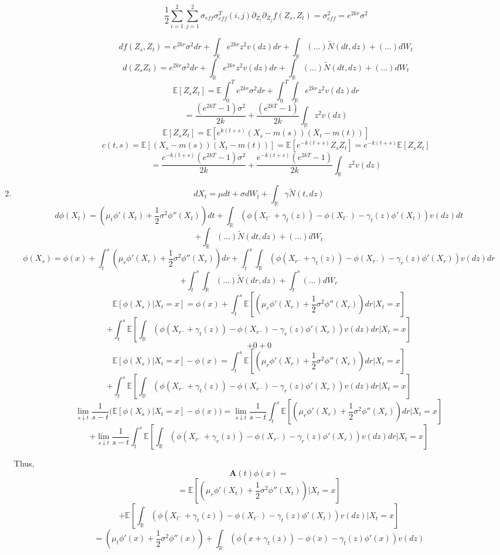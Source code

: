 \documentclass[a4paper,11pt]{article}
\begin{document}
\begin{enumerate}
\begin{enumerate}
 \[\frac{1}{2} \sum_{i=1}^2\sum_{j=1}^2 \sigma_{eff}\sigma_{eff}^T (i,j) \partial_{Z_i} \partial_{Z_j}f(Z_s,Z_t) = \sigma_{eff}^2 = e^{2kr}\sigma^2\]
 
 \[df(Z_s,Z_t)= e^{2kr}\sigma^2 dr + \int_{\mathbb{R}} e^{2kr}z^2v(dz)dr + \int_{\mathbb{R}}(\dots) \widetilde{N}(dt,dz)+(\dots)dW_t \]
  \[d(Z_s Z_t)= e^{2kr}\sigma^2 dr + \int_{\mathbb{R}} e^{2kr}z^2v(dz)dr + \int_{\mathbb{R}}(\dots) \widetilde{N}(dt,dz)+(\dots)dW_t \]
    \[\mathbb{E}[Z_s Z_t]=\mathbb{E} \int_0^T e^{2kr}\sigma^2 dr + \int_0^T  \int_{\mathbb{R}} e^{2kr}z^2v(dz)dr \]
   \[=  \frac{(e^{2kT}-1)\sigma^2}{2k}  + \frac{(e^{2kT}-1)}{2k}  \int_{\mathbb{R}} z^2v(dz) \]
   \[\mathbb{E}[Z_s Z_t]=\mathbb{E}[e^{k(t+s)}(X_s-m(s)) (X_t-m(t))]\]
      \[c(t,s) = \mathbb{E}[(X_s-m(s)) (X_t-m(t))]=\mathbb{E}[e^{-k(t+s)}Z_s Z_t]= e^{-k(t+s)}\mathbb{E}[Z_s Z_t]\]
         \[=  \frac{e^{-k(t+s)}(e^{2kT}-1)\sigma^2}{2k}  + \frac{e^{-k(t+s)}(e^{2kT}-1)}{2k}  \int_{\mathbb{R}} z^2v(dz) \]
\end{enumerate}

\item 
\[dX_t = \mu dt + \sigma dW_t + \int_{\mathbb{R}}\gamma \widetilde{N}(t,dz) \]
\[d\phi(X_t) = (\mu_t \phi'(X_t)+ \frac{1}{2}\sigma^2 \phi''(X_t))dt+ \int_{\mathbb{R}} (\phi(X_{t^-}+\gamma_t(z))-\phi(X_{t^-})-\gamma_t(z)\phi'(X_{t}))v(dz)dt \]
\[+ \int_{\mathbb{R}}(\dots) \widetilde{N}(dt,dz)+(\dots)dW_t \]
\[\phi(X_s) = \phi(x)+\int_t^s (\mu_r \phi'(X_r)+ \frac{1}{2}\sigma^2 \phi''(X_r))dr+ \int_t^s\int_{\mathbb{R}} (\phi(X_{r^-}+\gamma_t(z))-\phi(X_{r^-})-\gamma_r(z)\phi'(X_{r}))v(dz)dr \]
\[+ \int_t^s \int_{\mathbb{R}}(\dots) \widetilde{N}(dr,dz)+ \int_t^s(\dots)dW_r \]
\[\mathbb{E}[\phi(X_s)|X_t=x] = \phi(x)+\int_t^s \mathbb{E}[ (\mu_r \phi'(X_r)+ \frac{1}{2}\sigma^2 \phi''(X_r))dr|X_t=x]\]\[+ \int_t^s\mathbb{E}[\int_{\mathbb{R}} (\phi(X_{r^-}+\gamma_t(z))-\phi(X_{r^-})-\gamma_r(z)\phi'(X_{r}))v(dz)dr|X_t=x] \]
\[+ 0 + 0\]
\[\mathbb{E}[\phi(X_s)|X_t=x] - \phi(x) =\int_t^s \mathbb{E}[ (\mu_r \phi'(X_r)+ \frac{1}{2}\sigma^2 \phi''(X_r))dr|X_t=x]\]\[+ \int_t^s\mathbb{E}[\int_{\mathbb{R}} (\phi(X_{r^-}+\gamma_t(z))-\phi(X_{r^-})-\gamma_r(z)\phi'(X_{r}))v(dz)dr|X_t=x] \]
\[\lim_{s \downarrow t} \frac{1}{s-t} \bigg(\mathbb{E}[\phi(X_s)|X_t=x] - \phi(x) \bigg) = \lim_{s \downarrow t}\frac{1}{s-t}\int_t^s \mathbb{E}[ (\mu_r \phi'(X_r)+ \frac{1}{2}\sigma^2 \phi''(X_r))dr|X_t=x]\]\[+ \lim_{s \downarrow t}\frac{1}{s-t}\int_t^s\mathbb{E}[\int_{\mathbb{R}} (\phi(X_{r^-}+\gamma_r(z))-\phi(X_{r^-})-\gamma_r(z)\phi'(X_{r}))v(dz)dr|X_t=x] \]

Thus, 
\[\mathbf {A}(t)\phi(x) = \]
\[ = \mathbb{E}[ (\mu_r \phi'(X_t)+ \frac{1}{2}\sigma^2 \phi''(X_t))|X_t=x]\]\[+ \mathbb{E}[\int_{\mathbb{R}} (\phi(X_{t^-}+\gamma_t(z))-\phi(X_{t^-})-\gamma_t(z)\phi'(X_{t}))v(dz)|X_t=x] \]
\[ = (\mu_t \phi'(x)+ \frac{1}{2}\sigma^2 \phi''(x))+ \int_{\mathbb{R}} (\phi(x+\gamma_t(z))-\phi(x)-\gamma_t(z)\phi'(x))v(dz) \]

\end{enumerate}
\end{document}
